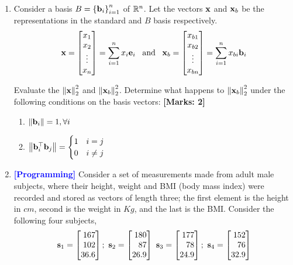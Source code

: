 \documentclass[12pt]{article}
\def\mf{\ensuremath\mathbf}
\def\mb{\ensuremath\mathbb}
\begin{document}
\begin{enumerate}
    \item Consider a basis $B = \left\{\mf{b}_i\right\}_{i=1}^{n}$ of $\mb{R}^n$. Let the vectors $\mf{x}$ and $\mf{x}_b$ be the representations in the standard and $B$ basis respectively. 
    \[ \mf{x} = \begin{bmatrix*}x_1\\x_2\\\vdots\\x_n\end{bmatrix*} = \sum_{i=1}^{n}x_i\mf{e}_i \,\,\,\,\, \text{and} \,\,\,\,\, \mf{x}_b =  \begin{bmatrix*}x_{b1}\\x_{b2}\\\vdots\\x_{bn}\end{bmatrix*} = \sum_{i=1}^{n}x_{bi}\mf{b}_i \]

    Evaluate the $\left\lVert \mf{x}\right\rVert_2^2$ and $\left\lVert \mf{x}_b\right\rVert_2^2$. Determine what happens to $\left\lVert \mf{x}_b\right\rVert_2^2$ under the following conditions on the basis vectors: \textbf{[Marks: 2]}
    \begin{enumerate}
        \item $\left\lVert \mf{b}_i\right\rVert = 1, \forall i$
        \item $\left\lVert \mf{b}_i^\top\mf{b}_j\right\rVert = \begin{cases}
        1 & i = j\\
        0 & i \neq j
        \end{cases}$
    \end{enumerate}

    \item \textcolor{blue}{\textbf{[Programming]}} Consider a set of measurements made from adult male subjects, where their height, weight and BMI (body mass index) were recorded and stored as vectors of length three; the first element is the height in $cm$, second is the weight in $Kg$, and the last is the BMI. Consider the following four subjects,
    \[ \mf{s}_1 =  \begin{bmatrix*}[r]167\\102\\36.6\end{bmatrix*}; \,\,
    \mf{s}_2 =  \begin{bmatrix*}[r]180\\87\\26.9\end{bmatrix*} \,\, \mf{s}_3 =  \begin{bmatrix*}[r]177\\78\\24.9\end{bmatrix*}; \,\,
    \mf{s}_4 =  \begin{bmatrix*}[r]152\\76\\32.9\end{bmatrix*} \]


\end{enumerate}
\end{document}
